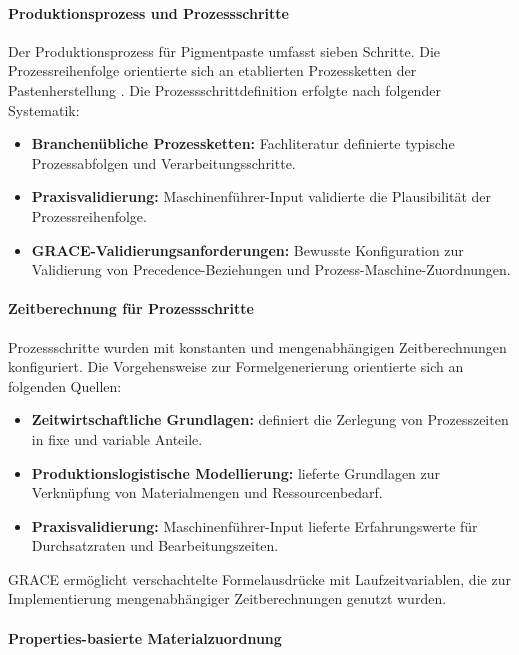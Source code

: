 \paragraph{Produktionsprozess und Prozessschritte}

Der Produktionsprozess für Pigmentpaste umfasst sieben Schritte. Die Prozessreihenfolge orientierte sich an etablierten Prozessketten der Pastenherstellung \citep{goldschmidt:lackproduktion2019, vci:lacke_farben2018}. Die Prozessschrittdefinition erfolgte nach folgender Systematik:

\begin{itemize}
    \item \textbf{Branchenübliche Prozessketten:} Fachliteratur definierte typische Prozessabfolgen und Verarbeitungsschritte.
    \item \textbf{Praxisvalidierung:} Maschinenführer-Input validierte die Plausibilität der Prozessreihenfolge.
    \item \textbf{GRACE-Validierungsanforderungen:} Bewusste Konfiguration zur Validierung von Precedence-Beziehungen und Prozess-Maschine-Zuordnungen.
\end{itemize}

\paragraph{Zeitberechnung für Prozessschritte}

Prozessschritte wurden mit konstanten und mengenabhängigen Zeitberechnungen konfiguriert. Die Vorgehensweise zur Formelgenerierung orientierte sich an folgenden Quellen:

\begin{itemize}
    \item \textbf{Zeitwirtschaftliche Grundlagen:} \cite{REFA2012} definiert die Zerlegung von Prozesszeiten in fixe und variable Anteile.
    \item \textbf{Produktionslogistische Modellierung:} \cite{guenther:produktion2020} lieferte Grundlagen zur Verknüpfung von Materialmengen und Ressourcenbedarf.
    \item \textbf{Praxisvalidierung:} Maschinenführer-Input lieferte Erfahrungswerte für Durchsatzraten und Bearbeitungszeiten.
\end{itemize}

GRACE ermöglicht verschachtelte Formelausdrücke mit Laufzeitvariablen, die zur Implementierung mengenabhängiger Zeitberechnungen genutzt wurden.

\paragraph{Properties-basierte Materialzuordnung}

